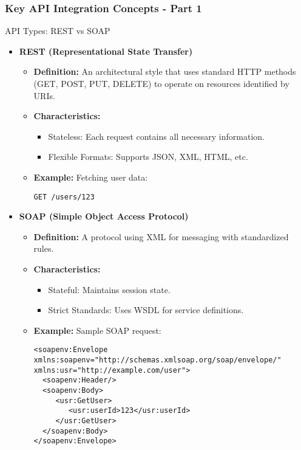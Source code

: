\documentclass[aspectratio=169]{beamer}
\begin{document}
\begin{frame}[fragile]
  \frametitle{Key API Integration Concepts - Part 1}
  \begin{block}{API Types: REST vs SOAP}
    \begin{itemize}
      \item \textbf{REST (Representational State Transfer)}
        \begin{itemize}
          \item \textbf{Definition:} An architectural style that uses standard HTTP methods (GET, POST, PUT, DELETE) to operate on resources identified by URIs.
          \item \textbf{Characteristics:}
            \begin{itemize}
              \item Stateless: Each request contains all necessary information.
              \item Flexible Formats: Supports JSON, XML, HTML, etc.
            \end{itemize}
          \item \textbf{Example:} Fetching user data:
            \begin{lstlisting}
GET /users/123
            \end{lstlisting}
        \end{itemize}
        
      \item \textbf{SOAP (Simple Object Access Protocol)}
        \begin{itemize}
          \item \textbf{Definition:} A protocol using XML for messaging with standardized rules.
          \item \textbf{Characteristics:}
            \begin{itemize}
              \item Stateful: Maintains session state.
              \item Strict Standards: Uses WSDL for service definitions.
            \end{itemize}
          \item \textbf{Example:} Sample SOAP request:
            \begin{lstlisting}
<soapenv:Envelope xmlns:soapenv="http://schemas.xmlsoap.org/soap/envelope/" xmlns:usr="http://example.com/user">
  <soapenv:Header/>
  <soapenv:Body>
     <usr:GetUser>
        <usr:userId>123</usr:userId>
     </usr:GetUser>
  </soapenv:Body>
</soapenv:Envelope>
            \end{lstlisting}
        \end{itemize}
    \end{itemize}
  \end{block}
\end{frame}
\end{document}
